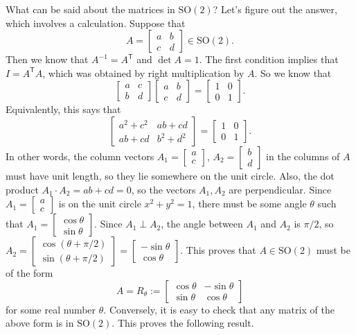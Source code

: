 \documentclass[11pt]{article}
\theoremstyle{definition}
\newcommand{\SO}{\mathrm{SO}}
\newcommand{\transpose}{\mathsf{T}}
\begin{document}
What can be said about the matrices in $\SO(2)$? Let's figure out the
answer, which involves a calculation. Suppose that 
\[
  A = 
  \begin{bmatrix}
    a&b\\c&d
  \end{bmatrix}
  \in \SO(2).
\]
Then we know that $A^{-1} = A^\transpose$ and $\det A = 1$. The first
condition implies that $I = A^\transpose A$, which was obtained by
right multiplication by $A$. So we know that
\[
    \begin{bmatrix}
    a&c\\b&d
  \end{bmatrix}
    \begin{bmatrix}
    a&b\\c&d
  \end{bmatrix} = 
  \begin{bmatrix} 1&0\\0&1\end{bmatrix} .
\]
Equivalently, this says that 
\[
  \begin{bmatrix}
    a^2+c^2&ab+cd\\ab+cd&b^2+d^2
  \end{bmatrix} = 
  \begin{bmatrix} 1&0\\0&1\end{bmatrix} .
\]
In other words, the column vectors
$A_1 = [\begin{smallmatrix} a\\c \end{smallmatrix}]$,
$A_2 = [\begin{smallmatrix} b\\d \end{smallmatrix}]$ in the columns of
$A$ must have unit length, so they lie somewhere on the unit
circle. Also, the dot product $A_1 \cdot A_2 = ab+cd = 0$, so the
vectors $A_1, A_2$ are perpendicular. Since
$A_1 = [\begin{smallmatrix} a\\c \end{smallmatrix}]$ is on the unit
circle $x^2 + y^2 =1$, there must be some angle $\theta$ such that
$A_1 = [\begin{smallmatrix} \cos \theta \\ \sin
  \theta \end{smallmatrix}]$.
Since $A_1 \perp A_2$, the angle between $A_1$ and $A_2$ is $\pi/2$,
so
$A_2 = [\begin{smallmatrix} \cos(\theta+\pi/2) \\
  \sin(\theta+\pi/2) \end{smallmatrix}] = [\begin{smallmatrix} -\sin
  \theta \\ \cos \theta \end{smallmatrix}]$.
This proves that $A \in \SO(2)$ must be of the form
\[
A = R_\theta :=
\begin{bmatrix}
  \cos \theta & -\sin \theta \\ \sin \theta & \cos \theta
\end{bmatrix}
\]
for some real number $\theta$. Conversely, it is easy to check that
any matrix of the above form is in $\SO(2)$. This proves the following
result.
\end{document}
